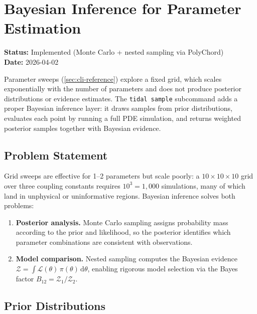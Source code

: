 
\section{Bayesian Inference for Parameter Estimation}
\label{sec:inference}

\textbf{Status:} Implemented (Monte Carlo + nested sampling via PolyChord) \\
\textbf{Date:} 2026-04-02

Parameter sweeps (\cref{sec:cli-reference}) explore a fixed grid, which scales
exponentially with the number of parameters and does not produce posterior
distributions or evidence estimates.  The \texttt{tidal sample} subcommand adds
a proper Bayesian inference layer: it draws samples from prior distributions,
evaluates each point by running a full PDE simulation, and returns weighted
posterior samples together with Bayesian evidence.

\subsection{Problem Statement}
\label{sec:inference-problem}

Grid sweeps are effective for 1--2 parameters but scale poorly: a
$10\times10\times10$ grid over three coupling constants requires $10^3 =
1{,}000$ simulations, many of which land in unphysical or uninformative
regions.  Bayesian inference solves both problems:

\begin{enumerate}
  \item \textbf{Posterior analysis.}  Monte Carlo sampling assigns probability
    mass according to the prior and likelihood, so the posterior identifies
    which parameter combinations are consistent with observations.

  \item \textbf{Model comparison.}  Nested sampling computes the Bayesian
    evidence $\mathcal{Z} = \int \mathcal{L}(\theta)\,\pi(\theta)\,\mathrm{d}\theta$,
    enabling rigorous model selection via the Bayes factor
    $B_{12} = \mathcal{Z}_1/\mathcal{Z}_2$.
\end{enumerate}

\subsection{Prior Distributions}
\label{sec:inference-priors}

